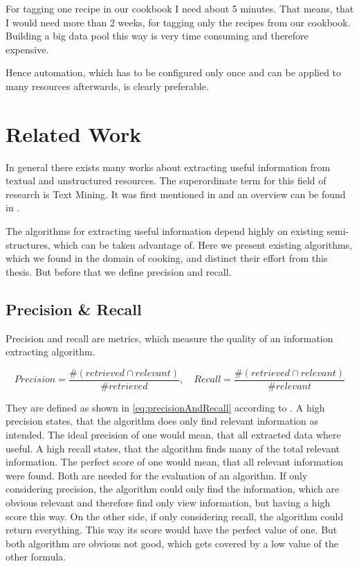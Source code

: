 \documentclass[12pt, twoside]{report}
\begin{document}
For tagging one recipe in our cookbook I need about 5 minutes. That means, that I would need more than 2 weeks, for tagging only the recipes from our cookbook. Building a big data pool this way is very time consuming and therefore expensive.

Hence automation, which has to be configured only once and can be applied to many resources afterwards, is clearly preferable.



\chapter{Related Work}
In general there exists many works about extracting useful information from textual and unstructured resources. The superordinate term for this field of research is Text Mining. It was first mentioned in \parencite{KDT} and an overview can be found in \parencite{surveyOfTextMining}. 

The algorithms for extracting useful information depend highly on existing semi-structures, which can be taken advantage of. Here we present existing algorithms, which we found in the domain of cooking, and distinct their effort from this thesis. But before that we define precision and recall.

\section{Precision \& Recall}
Precision and recall are metrics, which measure the quality of an information extracting algorithm.

\begin{equation} \label{eq:precisionAndRecall}
	Precision = \frac{\#(retrieved \cap relevant)}{\#retrieved}, \hspace{1em} Recall = \frac{\#(retrieved \cap relevant)}{\#relevant}
\end{equation}

They are defined as shown in \cref{eq:precisionAndRecall} according to  \parencite{surveyOfTextMining}. A high precision states, that the algorithm does only find relevant information as intended. The ideal precision of one would mean, that all extracted data where useful. A high recall states, that the algorithm finds many of the total relevant information. The perfect score of one would mean, that all relevant information were found. Both are needed for the evaluation of an algorithm. If only considering precision, the algorithm could only find the information, which are obvious relevant and therefore find only view information, but having a high score this way. On the other side, if only considering recall, the algorithm could return everything. This way its score would have the perfect value of one. But both algorithm are obvious not good, which gets covered by a low value of the other formula.
\end{document}
